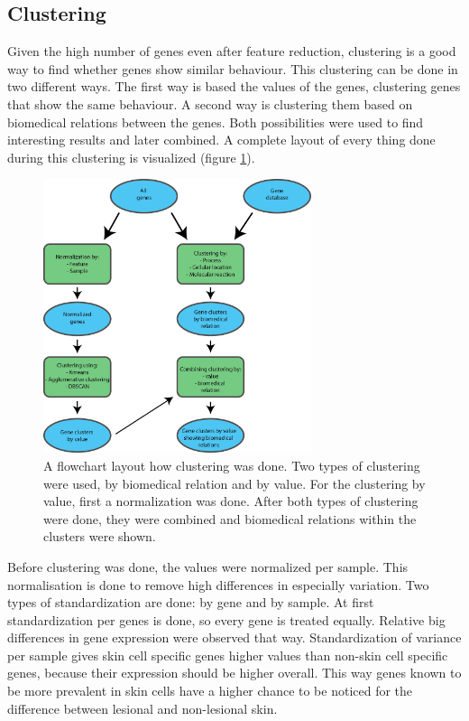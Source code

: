 \documentclass[10pt,a4paper]{article}
\begin{document}
	\subsection{Clustering}
	\label{subsec:MethodsPositionalClustering}
	
	Given the high number of genes even after feature reduction, clustering is a good way to find whether genes show similar behaviour. This clustering can be done in two different ways. The first way is based the values of the genes, clustering genes that show the same behaviour. A second way is clustering them based on biomedical relations between the genes. Both possibilities were used to find interesting results and later combined. A complete layout of every thing done during this clustering is visualized (figure \ref{fig:ClusteringLayout}).
	
		\begin{figure}[H]
		\includegraphics[width=0.7\textwidth]{ClusteringLayout.png}
		\caption{A flowchart layout how clustering was done. Two types of clustering were used, by biomedical relation and by value. For the clustering by value, first a normalization was done. After both types of clustering were done, they were combined and biomedical relations within the clusters were shown.}
		\label{fig:ClusteringLayout}
	\end{figure}
	
	Before clustering was done, the values were normalized per sample. This normalisation is done to remove high differences in especially variation. Two types of standardization are done: by gene and by sample. At first standardization per genes is done, so every gene is treated equally. Relative big differences in gene expression were observed that way. Standardization of variance per sample gives skin cell specific genes higher values than non-skin cell specific genes, because their expression should be higher overall. This way genes known to be more prevalent in skin cells have a higher chance to be noticed for the difference between lesional and non-lesional skin.
	
\end{document}
